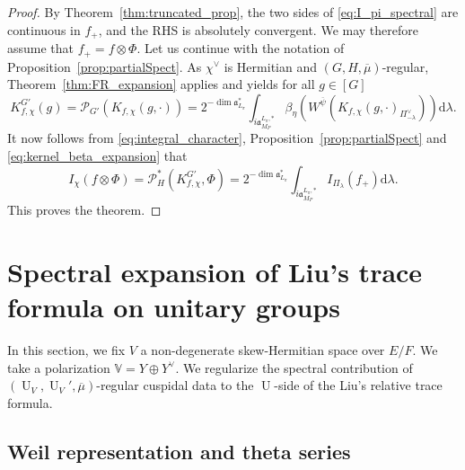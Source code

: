 \documentclass[letterpaper,11pt]{amsart}
\newcommand{\bV}{\mathbb{V}}
\newcommand{\cP}{\mathcal{P}}
\newcommand{\rd}{\mathrm{d}}
\newcommand{\<}{\negthickspace}
\DeclareMathOperator{\U}{U}
\theoremstyle{definition}
\theoremstyle{plain}
\theoremstyle{remark}
\numberwithin{equation}{section}
\begin{document}
\begin{proof}
By Theorem~\ref{thm:truncated_prop}, the two sides of
\eqref{eq:I_pi_spectral} are continuous in $f_+$, and the RHS is absolutely
convergent. We may therefore assume that $f_+=f \otimes \Phi$. Let us
continue with the notation of Proposition~\ref{prop:partialSpect}. As $\chi^\vee$
is Hermitian and $(G,H,\overline{\mu})$-regular, Theorem~\ref{thm:FR_expansion} applies and yields for
all $g \in [G]$
    \begin{equation}    \label{eq:kernel_beta_expansion}
    K_{f, \chi}^{G'}(g)
    =\cP_{G'}(K_{f, \chi}(g, \cdot))=
    2^{-\dim \mathfrak{a}_{L_\pi}^*} \int_{i \mathfrak{a}_{M_P}^{L_\pi, *}}
   \beta_{\eta}\left(
        W^{\overline{\psi}}\left(K_{f, \chi}(g, \cdot)_{\Pi^\vee_{-\lambda}} \right) \right) \rd \lambda.
    \end{equation}
It now follows from \eqref{eq:integral_character},
Proposition~\ref{prop:partialSpect} and \eqref{eq:kernel_beta_expansion} that
    \begin{equation*}
    I_\chi(f \otimes \Phi) =\cP_{H}^*\left(K^{G'}_{f, \chi}, \Phi\right)
    =2^{-\dim \mathfrak{a}_{L_\pi}^*}
    \int_{i \mathfrak{a}_{M_P}^{L_\pi, *}} I_{\Pi_\lambda}(f_+)
    \rd \lambda.
    \end{equation*}
This proves the theorem.
\end{proof}


\section{Spectral expansion of Liu's trace formula on unitary groups}
\label{sec:spectral_calculation_U}

\label{sec:spec_U}

In this section, we fix $V$ a non-degenerate skew-Hermitian space over $E/F$. We take a polarization $\bV=Y \oplus Y^\vee$. We regularize the spectral contribution of $(\U_V,\U_V',\overline{\mu})$-regular cuspidal data to the $\U$-side of the Liu's relative trace formula.

\subsection{Weil representation and theta series}
\end{document}
